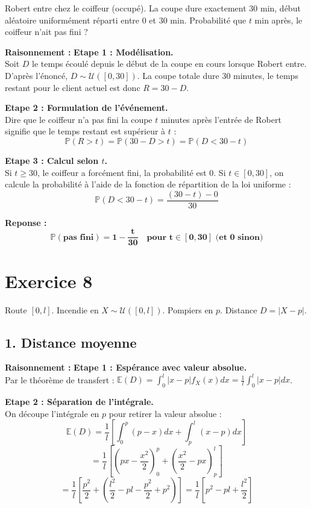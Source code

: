 \documentclass[11pt,a4paper]{article}
\begin{document}
Robert entre chez le coiffeur (occupé). La coupe dure exactement 30 min, début aléatoire uniformément réparti entre 0 et 30 min. Probabilité que $t$ min après, le coiffeur n'ait pas fini ?

\textbf{Raisonnement :}
\textbf{Etape 1 : Modélisation.}\\
Soit $D$ le temps écoulé depuis le début de la coupe en cours lorsque Robert entre. D'après l'énoncé, $D \sim \mathcal{U}([0, 30])$.
La coupe totale dure 30 minutes, le temps restant pour le client actuel est donc $R = 30 - D$.

\textbf{Etape 2 : Formulation de l'événement.}\\
Dire que le coiffeur n'a pas fini la coupe $t$ minutes après l'entrée de Robert signifie que le temps restant est supérieur à $t$ :
$$ \mathbb{P}(R > t) = \mathbb{P}(30 - D > t) = \mathbb{P}(D < 30 - t) $$

\textbf{Etape 3 : Calcul selon $t$.}\\
Si $t \ge 30$, le coiffeur a forcément fini, la probabilité est 0.
Si $t \in [0, 30]$, on calcule la probabilité à l'aide de la fonction de répartition de la loi uniforme :
$$ \mathbb{P}(D < 30 - t) = \frac{(30 - t) - 0}{30} $$

\textbf{Reponse :}
$$ \mathbf{\mathbb{P}(\text{pas fini}) = 1 - \frac{t}{30} \quad \text{pour } t \in [0, 30] \text{ (et 0 sinon)}} $$

\hrulefill

\section*{Exercice 8}

Route $[0, l]$. Incendie en $X \sim \mathcal{U}([0, l])$. Pompiers en $p$. Distance $D = |X-p|$.

\subsection*{1. Distance moyenne}

\textbf{Raisonnement :}
\textbf{Etape 1 : Espérance avec valeur absolue.}\\
Par le théorème de transfert : $\mathbb{E}(D) = \int_0^l |x-p| f_X(x) dx = \frac{1}{l} \int_0^l |x-p| dx$.

\textbf{Etape 2 : Séparation de l'intégrale.}\\
On découpe l'intégrale en $p$ pour retirer la valeur absolue :
$$ \mathbb{E}(D) = \frac{1}{l} \left[ \int_0^p (p-x) dx + \int_p^l (x-p) dx \right] $$
$$ = \frac{1}{l} \left[ \left(px - \frac{x^2}{2}\right)_0^p + \left(\frac{x^2}{2} - px\right)_p^l \right] $$
$$ = \frac{1}{l} \left[ \frac{p^2}{2} + \left( \frac{l^2}{2} - pl - \frac{p^2}{2} + p^2 \right) \right] = \frac{1}{l} \left[ p^2 - pl + \frac{l^2}{2} \right] $$
\end{document}
